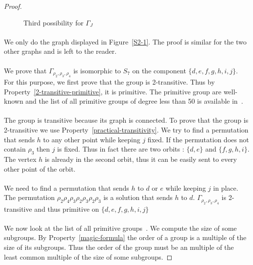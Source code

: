 \begin{proof}
\begin{figure}[H]
\begin{center}
\begin{tikzpicture}[scale=.8]
      \end{tikzpicture}
      \caption{Third possibility for $\Gamma_{J}$}
    \end{center}
  \end{figure}

  \paragraph{}
  We only do the graph displayed in Figure~\ref{S2-1}. The proof is similar for the two other graphs and is left to the reader.

  \paragraph{}
  We prove that $\Gamma_{\rho_2,\rho_3,\rho_4}$ is isomorphic to $S_7$ on the component $\{d,e,f,g,h,i,j\}$. For this purpose, we first prove that the group is 2-transitive. Thus by Property~\ref{2-transitive-primitive}, it is primitive. The primitive group are well-known and the list of all primitive groups of degree less than 50 is available in~\cite{buekenhout1996list}.

  \paragraph{}
  The group is transitive because its graph is connected. To prove that the group is 2-transitive we use Property~\ref{practical-transitivity}. We try to find a permutation that sends $h$ to any other point while keeping $j$ fixed. If the permutation does not contain $\rho_3$ then $j$ is fixed. Thus in fact there are two orbits : $\{d,e\}$ and $\{f,g,h,i\}$. The vertex $h$ is already in the second orbit, thus it can be easily sent to every other point of the orbit.

  \paragraph{}
  We need to find a permutation that sends $h$ to $d$ or $e$ while keeping $j$ in place. The permutation $\rho_2 \rho_4 \rho_3 \rho_2 \rho_3 \rho_2 \rho_3$ is a solution that sends $h$ to $d$. $\Gamma_{\rho_2, \rho_3, \rho_4}$ is 2-transitive and thus primitive on $\{d,e,f,g,h,i,j\}$

  \paragraph{}
  We now look at the list of all primitive groups~\cite{buekenhout1996list}. We compute the size of some subgroups. By Property~\ref{magic-formula} the order of a group is a multiple of the size of its subgroups. Thus the order of the group must be an multiple of the least common multiple of the size of some subgroups.


\end{proof}
